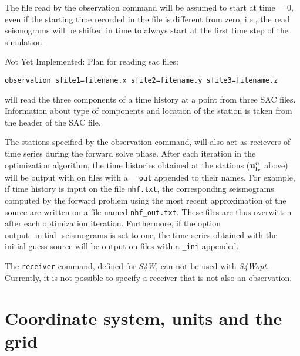 \documentclass[11pt]{report}
\begin{document}
The file read by the observation command will be
assumed to start at time = 0, even if the starting time recorded in the file is different from zero,
i.e., the read seismograms will be shifted in time to always start at the first time step of the
simulation.

{\emph Not Yet Implemented:}
Plan for reading sac files:
\begin{verbatim}
observation sfile1=filename.x sfile2=filename.y sfile3=filename.z
\end{verbatim}
will read the three components of a time history at a point from three SAC files. Information about type of
components and location of the station is taken from the header of the SAC file.

The stations specified by the observation command, will also act as recievers of time series during
the forward solve phase. After each iteration in the optimization algorithm, the time histories
obtained at the stations (${\bf u}^n_{{\bf i}_r}$ above) will be output with on files with a {\tt
  \_out} appended to their names. For example, if time history is input on the file {\tt nhf.txt},
the corresponding seismograms computed by the forward problem using the most recent approximation of
the source are written on a file named {\tt nhf\_out.txt}. These files are thus overwitten after each
optimization iteration. Furthermore, if the option output\_initial\_seismograms is set to one, the
time series obtained with the initial guess source will be output on files with a {\tt \_ini}
appended.  

The {\tt receiver} command, defined for \emph{S4W}, can not be used with
\emph{S4Wopt}. Currently, it is not possible to specify a receiver that is not also an observation.

\chapter{Coordinate system, units and the grid}
\end{document}
